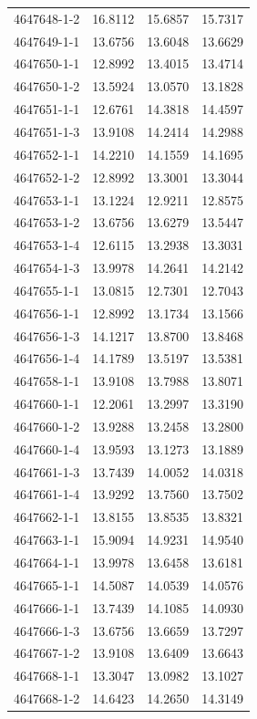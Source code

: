 \begin{longtable}{lrrr}
4647648-1-2 & 16.8112 & 15.6857 & 15.7317 \\
4647649-1-1 & 13.6756 & 13.6048 & 13.6629 \\
4647650-1-1 & 12.8992 & 13.4015 & 13.4714 \\
4647650-1-2 & 13.5924 & 13.0570 & 13.1828 \\
4647651-1-1 & 12.6761 & 14.3818 & 14.4597 \\
4647651-1-3 & 13.9108 & 14.2414 & 14.2988 \\
4647652-1-1 & 14.2210 & 14.1559 & 14.1695 \\
4647652-1-2 & 12.8992 & 13.3001 & 13.3044 \\
4647653-1-1 & 13.1224 & 12.9211 & 12.8575 \\
4647653-1-2 & 13.6756 & 13.6279 & 13.5447 \\
4647653-1-4 & 12.6115 & 13.2938 & 13.3031 \\
4647654-1-3 & 13.9978 & 14.2641 & 14.2142 \\
4647655-1-1 & 13.0815 & 12.7301 & 12.7043 \\
4647656-1-1 & 12.8992 & 13.1734 & 13.1566 \\
4647656-1-3 & 14.1217 & 13.8700 & 13.8468 \\
4647656-1-4 & 14.1789 & 13.5197 & 13.5381 \\
4647658-1-1 & 13.9108 & 13.7988 & 13.8071 \\
4647660-1-1 & 12.2061 & 13.2997 & 13.3190 \\
4647660-1-2 & 13.9288 & 13.2458 & 13.2800 \\
4647660-1-4 & 13.9593 & 13.1273 & 13.1889 \\
4647661-1-3 & 13.7439 & 14.0052 & 14.0318 \\
4647661-1-4 & 13.9292 & 13.7560 & 13.7502 \\
4647662-1-1 & 13.8155 & 13.8535 & 13.8321 \\
4647663-1-1 & 15.9094 & 14.9231 & 14.9540 \\
4647664-1-1 & 13.9978 & 13.6458 & 13.6181 \\
4647665-1-1 & 14.5087 & 14.0539 & 14.0576 \\
4647666-1-1 & 13.7439 & 14.1085 & 14.0930 \\
4647666-1-3 & 13.6756 & 13.6659 & 13.7297 \\
4647667-1-2 & 13.9108 & 13.6409 & 13.6643 \\
4647668-1-1 & 13.3047 & 13.0982 & 13.1027 \\
4647668-1-2 & 14.6423 & 14.2650 & 14.3149 \\

\end{longtable}
